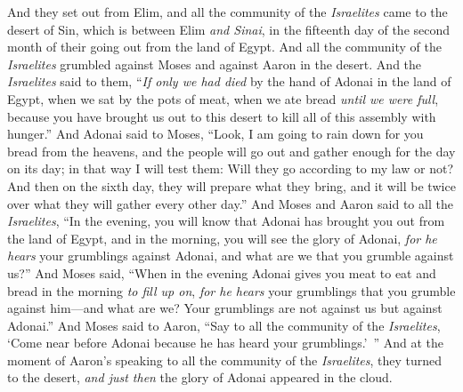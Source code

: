 \begin{biblechapter} %
 And they set out from Elim, and all the community of the \textit{Israelites} came to the desert of Sin, which is between Elim \textit{and Sinai}, in the fifteenth day of the second month of their going out from the land of Egypt.
\verse And all the community of the \textit{Israelites} grumbled against Moses and against Aaron in the desert.
\verse And the \textit{Israelites} said to them, “\textit{If only we had died} by the hand of Adonai in the land of Egypt, when we sat by the pots of meat, when we ate bread \textit{until we were full}, because you have brought us out to this desert to kill all of this assembly with hunger.”
\verse And Adonai said to Moses, “Look, I am going to rain down for you bread from the heavens, and the people will go out and gather enough for the day on its day; in that way I will test them: Will they go according to my law or not?
\verse And then on the sixth day, they will prepare what they bring, and it will be twice over what they will gather every other day.”
\verse And Moses and Aaron said to all the \textit{Israelites}, “In the evening, you will know that Adonai has brought you out from the land of Egypt,
\verse and in the morning, you will see the glory of Adonai, \textit{for he hears} your grumblings against Adonai, and what are we that you grumble against us?”
\verse And Moses said, “When in the evening Adonai gives you meat to eat and bread in the morning \textit{to fill up on}, \textit{for he hears} your grumblings that you grumble against him—and what are we? Your grumblings are not against us but against Adonai.”
\verse And Moses said to Aaron, “Say to all the community of the \textit{Israelites}, ‘Come near before Adonai because he has heard your grumblings.’ ”
\verse And at the moment of Aaron’s speaking to all the community of the \textit{Israelites}, they turned to the desert, \textit{and just then} the glory of Adonai appeared in the cloud.

\end{biblechapter}
